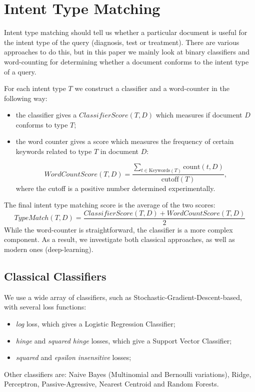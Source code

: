 \section{Intent Type Matching}
Intent type matching should tell us whether a particular document is useful for the intent type of the query 
(diagnosis, test or treatment). There are various approaches to do this, but in this paper we mainly look at
binary classifiers and word-counting for determining whether a document conforms to the intent type of a query.

For each intent type $T$ we construct a classifier and a word-counter in the following way:
\begin{itemize}
 \item the classifier gives a $ClassifierScore(T,D)$ which measures if document $D$ conforms to type $T$;
 \item the word counter gives a score which measures the frequency of certain keywords related to type $T$ in document $D$:
 
 \[WordCountScore(T,D) = \displaystyle\frac{\displaystyle\sum_{t\in \text{Keywords}(T)} \text{count}(t,D)}{\text{cutoff}(T)},\]
  where the cutoff is a positive number determined experimentally.
\end{itemize}


The final intent type matching score is the average of the two scores:
\[
 TypeMatch(T, D) = \displaystyle\frac{ClassifierScore(T,D) +  WordCountScore(T,D)}{2}
\]
While the word-counter is straightforward, the classifier is a more complex component. As a result, we investigate both
classical approaches, as well as modern ones (deep-learning).

\subsection{Classical Classifiers}

We use a wide array of classifiers, such as Stochastic-Gradient-Descent-based, with several loss functions:
    \begin{itemize}  \setlength\itemsep{-0.5em}
    \item \emph{log} loss, which gives a Logistic Regression Classifier;
    \item \emph{hinge} and \emph{squared hinge} losses, which give a Support Vector Classifier;
    \item \emph{squared} and \emph{epsilon insensitive} losses;
    \end{itemize}
Other classifiers are: Naive Bayes (Multinomial and Bernoulli variations), Ridge, Perceptron, Passive-Agressive, Nearest Centroid
and Random Forests.

